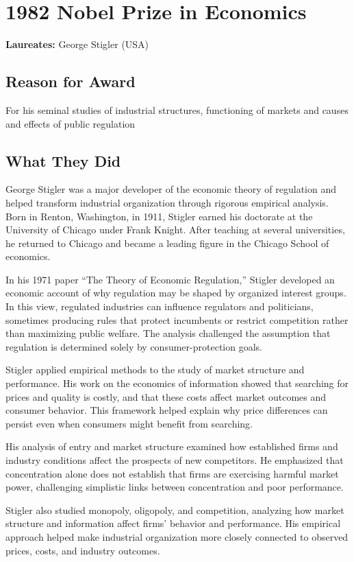 \chapter{1982 Nobel Prize in Economics}
\textbf{Laureates: }George Stigler (USA)

\section*{Reason for Award}
For his seminal studies of industrial structures, functioning of markets and causes
and effects of public regulation

\section{What They Did}
George Stigler was a major developer of the economic theory of regulation and
helped transform industrial organization through rigorous empirical analysis.
Born in Renton, Washington, in 1911, Stigler earned his doctorate at the
University of Chicago under Frank Knight. After teaching at several
universities, he returned to Chicago and became a leading figure in the
Chicago School of economics.

In his 1971 paper ``The Theory of Economic Regulation,'' Stigler developed an
economic account of why regulation may be shaped by organized interest
groups. In this view, regulated industries can influence regulators and
politicians, sometimes producing rules that protect incumbents or restrict
competition rather than maximizing public welfare. The analysis challenged
the assumption that regulation is determined solely by consumer-protection
goals.

Stigler applied empirical methods to the study of market structure and
performance. His work on the economics of information showed that searching
for prices and quality is costly, and that these costs affect market outcomes
and consumer behavior. This framework helped explain why price differences
can persist even when consumers might benefit from searching.

His analysis of entry and market structure examined how established firms and
industry conditions affect the prospects of new competitors. He emphasized
that concentration alone does not establish that firms are exercising harmful
market power, challenging simplistic links between concentration and poor
performance.

Stigler also studied monopoly, oligopoly, and competition, analyzing how
market structure and information affect firms' behavior and performance. His
empirical approach helped make industrial organization more closely connected
to observed prices, costs, and industry outcomes.

